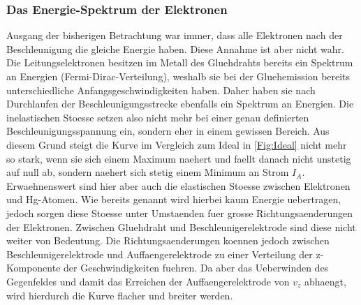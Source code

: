\subsubsection{Das Energie-Spektrum der Elektronen}
Ausgang der bisherigen Betrachtung war immer, dass alle Elektronen nach der Beschleunigung die gleiche Energie haben. Diese Annahme ist aber nicht wahr. Die Leitungselektronen besitzen im Metall des Gluehdrahts bereits ein Spektrum an Energien (Fermi-Dirac-Verteilung), weshalb sie bei der Gluehemission bereits unterschiedliche Anfangsgeschwindigkeiten haben. Daher haben sie nach Durchlaufen der Beschleunigungsstrecke ebenfalls ein Spektrum an Energien. Die inelastischen Stoesse setzen also nicht mehr bei einer genau definierten Beschleunigungsspannung ein, sondern eher in einem gewissen Bereich. Aus diesem Grund steigt die Kurve im Vergleich zum Ideal in \ref{Fig:Ideal} nicht mehr so stark, wenn sie sich einem Maximum naehert und faellt danach nicht unstetig auf null ab, sondern naehert sich stetig einem Minimum an Strom $I_A$.\\
Erwaehnenswert sind hier aber auch die elastischen Stoesse zwischen Elektronen und Hg-Atomen. Wie bereits genannt wird hierbei kaum Energie uebertragen, jedoch sorgen diese Stoesse unter Umstaenden fuer grosse Richtungsaenderungen der Elektronen. Zwischen Gluehdraht und Beschleunigerelektrode sind diese nicht weiter von Bedeutung. Die Richtungsaenderungen koennen jedoch zwischen Beschleunigerelektrode und Auffaengerelektrode zu einer Verteilung der z-Komponente der Geschwindigkeiten fuehren. Da aber das Ueberwinden des Gegenfeldes und damit das Erreichen der Auffaengerelektrode von $v_z$ abhaengt, wird hierdurch die Kurve flacher und breiter werden.\\
